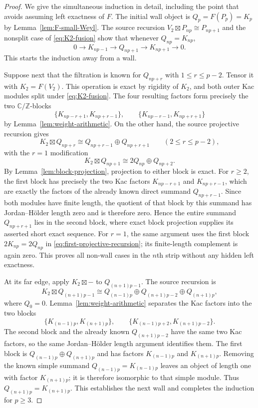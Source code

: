 \documentclass[12pt,leqno]{amsart}
\numberwithin{equation}{section}
\newcommand{\boxt}{\boxtimes}
\def\Z{\mathbb{Z}}
\def\C{\mathbb{C}}
\begin{document}
\begin{proof}
We give the simultaneous induction in detail, including the point that
avoids assuming left exactness of $F$.  The initial wall object is
$Q_p=F(P_p)=K_p$ by Lemma~\ref{lem:F-small-Weyl}.  The source recursion
$V_2\boxt P_{np}\cong P_{np+1}$ and the nonsplit case of
\eqref{eq:K2-fusion} show that whenever $Q_{np}=K_{np}$,
\[
 0\longrightarrow K_{np-1}\longrightarrow Q_{np+1}
 \longrightarrow K_{np+1}\longrightarrow0.
\]
This starts the induction away from a wall.

Suppose next that the filtration is known for $Q_{np+r}$ with
$1\leq r\leq p-2$.  Tensor it with $K_2=F(V_2)$.  This operation is exact
by rigidity of $K_2$, and both outer Kac modules split under
\eqref{eq:K2-fusion}.  The four resulting factors form precisely the two
$\C/\Z$-blocks
\[
 \{K_{np-r+1},K_{np+r-1}\},
 \qquad
 \{K_{np-r-1},K_{np+r+1}\}
\]
by Lemma~\ref{lem:weight-arithmetic}.  On the other hand, the source
projective recursion gives
\begin{equation}\label{eq:interior-projective-recursion}
 K_2\boxt Q_{np+r}
 \cong Q_{np+r-1}\oplus Q_{np+r+1}
 \qquad(2\leq r\leq p-2),
\end{equation}
with the $r=1$ modification
\begin{equation}\label{eq:first-projective-recursion}
 K_2\boxt Q_{np+1}\cong2Q_{np}\oplus Q_{np+2}.
\end{equation}
By Lemma~\ref{lem:block-projection}, projection to either block is exact.
For $r\geq2$, the first block has precisely the two Kac factors
$K_{np-r+1}$ and $K_{np+r-1}$, which are exactly the factors of the already
known direct summand $Q_{np+r-1}$.  Since both modules have finite length,
the quotient of that block by this summand has Jordan--H\"older length zero
and is therefore zero.  Hence the entire summand $Q_{np+r+1}$ lies in the
second block, where exact block projection supplies its asserted short
exact sequence.  For $r=1$, the same argument uses the first block
$2K_{np}=2Q_{np}$ in \eqref{eq:first-projective-recursion}; its finite-length
complement is again zero.  This proves all non-wall cases in the $n$th
strip without any hidden left exactness.

At its far edge, apply $K_2\boxt-$ to $Q_{(n+1)p-1}$.  The source recursion is
\begin{equation}\label{eq:wall-projective-recursion}
 K_2\boxt Q_{(n+1)p-1}
 \cong Q_{(n-1)p}\oplus Q_{(n+1)p-2}\oplus Q_{(n+1)p},
\end{equation}
where $Q_0=0$.  Lemma~\ref{lem:weight-arithmetic} separates the Kac factors
into the two blocks
\[
 \{K_{(n-1)p},K_{(n+1)p}\},
 \qquad
 \{K_{(n-1)p+2},K_{(n+1)p-2}\}.
\]
The second block and the already known $Q_{(n+1)p-2}$ have the same two
Kac factors, so the same Jordan--H\"older length argument identifies them.
The first block is $Q_{(n-1)p}\oplus Q_{(n+1)p}$ and has factors
$K_{(n-1)p}$ and $K_{(n+1)p}$.  Removing the known simple summand
$Q_{(n-1)p}=K_{(n-1)p}$ leaves an object of length one with factor
$K_{(n+1)p}$; it is therefore isomorphic to that simple module.  Thus
$Q_{(n+1)p}=K_{(n+1)p}$.  This establishes the next wall and completes the
induction for $p\geq3$.


\end{proof}
\end{document}
